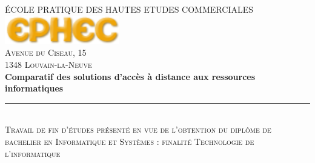 \begin{titlepage}
\newcommand{\HRule}{\rule{\linewidth}{0.5mm}} %

\center %
 

\textsc{\large ÉCOLE PRATIQUE DES HAUTES ETUDES COMMERCIALES}\\[0.5cm] %


\includegraphics[width=5cm]{ephec.png}\\[0.5cm] %
 

\textsc{Avenue du Ciseau, 15}\\ %
\textsc{1348 Louvain-la-Neuve}\\[1.5cm] %


{ \huge \bfseries Comparatif des solutions d'accès à distance aux ressources informatiques}\\[0.4cm] %
\HRule \\[0.4cm]
\textsc{\small Travail de fin d'études présenté en vue de l'obtention du diplôme de bachelier en Informatique et Systèmes : finalité Technologie de l'informatique}\\[1.5cm] %
 


\end{titlepage}
